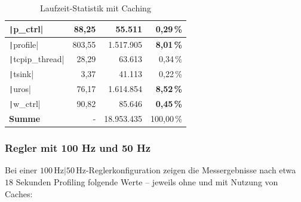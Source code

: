 \begin{table}[H]
{{\begin{minipage}[b]{0.50\hsize}
\begin{tabular}{|l|r|r|r|}
        \texttt|p_ctrl| & 88,25 & 55.511 & \textbf{0,29\,\%} \\ \hline
        \texttt|profile| & 803,55 & 1.517.905 & \textbf{8,01\,\%} \\ \hline
        \texttt|tcpip_thread| & 28,29 & 63.613 & 0,34\,\% \\ \hline
        \texttt|tsink| & 3,37 & 41.113 & 0,22\,\% \\ \hline
        \texttt|uros| & 76,17 & 1.614.854 & \textbf{8,52\,\%} \\ \hline
        \texttt|w_ctrl| & 90,82 & 85.646 & \textbf{0,45\,\%} \\ \hline
        \hline
        \textbf{Summe} & - & 18.953.435 & 100,00\,\% \\ \hline
        \end{tabular}
        \caption{Laufzeit-Statistik mit Caching}
    \end{minipage}
}}
\end{table}

\subsubsection{Regler mit 100 Hz und 50 Hz}

Bei einer $100\,\text{Hz}|50\,\text{Hz}$-Reglerkonfiguration zeigen die
Messergebnisse nach etwa $18$ Sekunden Profiling folgende Werte -- jeweils ohne
und mit Nutzung von Caches:

